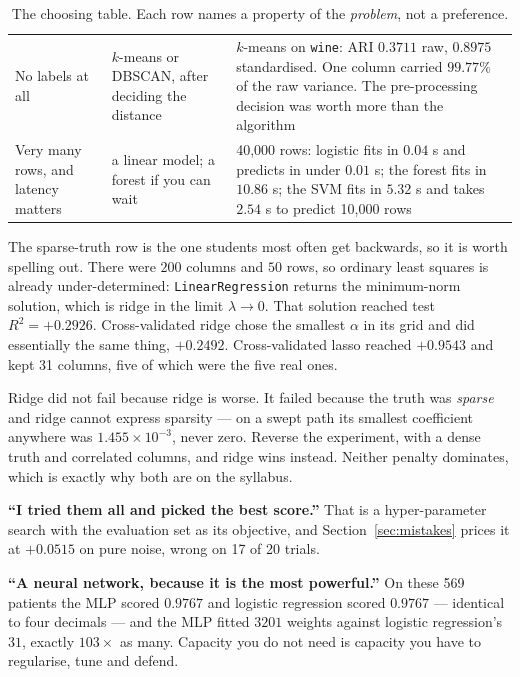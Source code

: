 \documentclass[11pt]{article}
\begin{document}
\begin{table}[t]
\begin{tabular}{@{}p{2.7cm}p{3.1cm}p{8.0cm}@{}}
    No labels at all &
    $k$-means or DBSCAN,
    after deciding the
    distance &
    $k$-means on \texttt{wine}: ARI $0.3711$ raw, $\mathbf{0.8975}$
    standardised. One column carried $99.77\%$ of the raw variance. The
    pre-processing decision was worth more than the algorithm \\[0.4em]
    Very many rows, and
    latency matters &
    a linear model; a
    forest if you can
    wait &
    40{,}000 rows: logistic fits in $\mathbf{0.04}$ s and predicts in under
    $0.01$ s; the forest fits in $10.86$ s; the SVM fits in $5.32$ s and
    takes $2.54$ s to predict 10{,}000 rows \\
    \bottomrule
  \end{tabular}
  \caption{The choosing table. Each row names a property of the
  \emph{problem}, not a preference.}
  \label{tab:choose}
\end{table}

\begin{worked}
The sparse-truth row is the one students most often get backwards, so it is
worth spelling out. There were $200$ columns and $50$ rows, so ordinary least
squares is already under-determined: \texttt{LinearRegression} returns the
minimum-norm solution, which is ridge in the limit $\lambda \to 0$. That
solution reached test $R^2 = +0.2926$. Cross-validated ridge chose the
smallest $\alpha$ in its grid and did essentially the same thing,
$+0.2492$. Cross-validated lasso reached $+0.9543$ and kept 31 columns, five
of which were the five real ones.

Ridge did not fail because ridge is worse. It failed because the truth was
\emph{sparse} and ridge cannot express sparsity --- on a swept path its
smallest coefficient anywhere was $1.455 \times 10^{-3}$, never zero. Reverse
the experiment, with a dense truth and correlated columns, and ridge wins
instead. Neither penalty dominates, which is exactly why both are on the
syllabus.
\end{worked}

\begin{caution}
\textbf{``I tried them all and picked the best score.''} That is a
hyper-parameter search with the evaluation set as its objective, and
Section~\ref{sec:mistakes} prices it at $+0.0515$ on pure noise, wrong on 17
of 20 trials.

\textbf{``A neural network, because it is the most powerful.''} On these 569
patients the MLP scored $0.9767$ and logistic regression scored $0.9767$ ---
identical to four decimals --- and the MLP fitted $3201$ weights against
logistic regression's $31$, exactly $103\times$ as many.
Capacity you do not need is capacity you have to regularise, tune and defend.
\end{caution}
\end{document}
